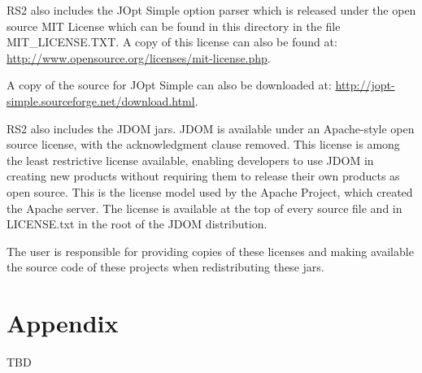 \documentclass[12pt]{article}
\begin{document}
RS2 also includes the JOpt Simple option parser which is released under
the open source MIT License which can be found in this directory in the file
MIT\_LICENSE.TXT.  A copy of this license can also be found at:
\url{http://www.opensource.org/licenses/mit-license.php}.
   
A copy of the source for JOpt Simple can also be downloaded at:
\url{http://jopt-simple.sourceforge.net/download.html}.

RS2 also includes the JDOM jars.  JDOM is available under an Apache-style open
source license, with the acknowledgment clause removed. This license is among
the least restrictive license available, enabling developers to use JDOM in
creating new products without requiring them to release their own products as
open source. This is the license model used by the Apache Project, which created
the Apache server. The license is available at the top of every source file and
in LICENSE.txt in the root of the JDOM distribution.                

The user is responsible for providing copies of these licenses and making
available the source code of these projects when redistributing these jars.

\section{Appendix}
TBD
\end{document}
